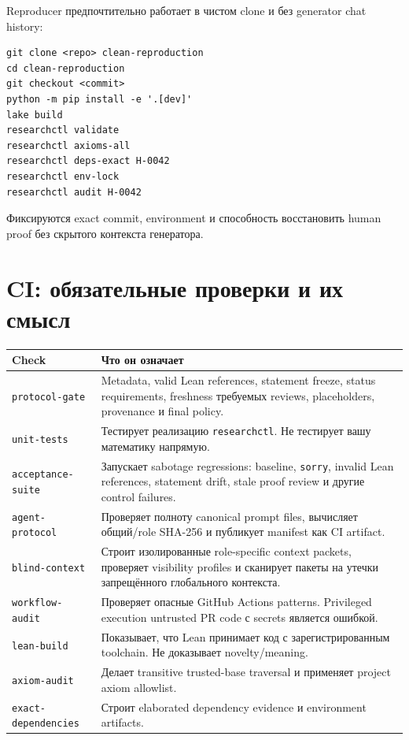 \documentclass[11pt,a4paper]{article}
\begin{document}
Reproducer предпочтительно работает в чистом clone и без generator chat history:

\begin{lstlisting}
git clone <repo> clean-reproduction
cd clean-reproduction
git checkout <commit>
python -m pip install -e '.[dev]'
lake build
researchctl validate
researchctl axioms-all
researchctl deps-exact H-0042
researchctl env-lock
researchctl audit H-0042
\end{lstlisting}

Фиксируются exact commit, environment и способность восстановить human proof без скрытого контекста генератора.

\section{CI: обязательные проверки и их смысл}

\begin{longtable}{@{}p{}p{}@{}}
\toprule
\textbf{Check} & \textbf{Что он означает} \\
\midrule
\endhead
\texttt{protocol-gate} & Metadata, valid Lean references, statement freeze, status requirements, freshness требуемых reviews, placeholders, provenance и final policy. \\
\texttt{unit-tests} & Тестирует реализацию \texttt{researchctl}. Не тестирует вашу математику напрямую. \\
\texttt{acceptance-suite} & Запускает sabotage regressions: baseline, \texttt{sorry}, invalid Lean references, statement drift, stale proof review и другие control failures. \\
\texttt{agent-protocol} & Проверяет полноту canonical prompt files, вычисляет общий/role SHA-256 и публикует manifest как CI artifact. \\
\texttt{blind-context} & Строит изолированные role-specific context packets, проверяет visibility profiles и сканирует пакеты на утечки запрещённого глобального контекста. \\
\texttt{workflow-audit} & Проверяет опасные GitHub Actions patterns. Privileged execution untrusted PR code с secrets является ошибкой. \\
\texttt{lean-build} & Показывает, что Lean принимает код с зарегистрированным toolchain. Не доказывает novelty/meaning. \\
\texttt{axiom-audit} & Делает transitive trusted-base traversal и применяет project axiom allowlist. \\
\texttt{exact-dependencies} & Строит elaborated dependency evidence и environment artifacts. \\
\bottomrule
\end{longtable}
\end{document}
